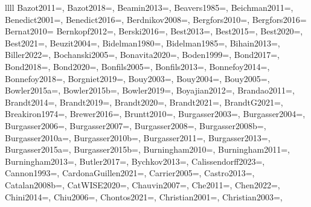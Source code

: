 \documentclass[twocolumn,tighten,twocolappendix]{aastex631}
\begin{document}
\begin{deluxetable*}{llll}
{Bazot2011=\cite{bazot2011},
Bazot2018=\cite{bazot2018},
Beamin2013=\cite{beamin2013},
Beavers1985=\cite{beavers1985},
Beichman2011=\cite{beichman2011},
Benedict2001=\cite{benedict2001},
Benedict2016=\cite{benedict2016},
Berdnikov2008=\cite{berdnikov2008},
Bergfors2010=\cite{bergfors2010},
Bergfors2016=\cite{bergfors2016}
Bernat2010=\cite{bernat2010}
Bernkopf2012=\cite{bernkopf2012},
Berski2016=\cite{berski2016},
Best2013=\cite{best2013},
Best2015=\cite{best2015},
Best2020=\cite{best2020},
Best2021=\cite{best2021},
Beuzit2004=\cite{beuzit2004},
Bidelman1980=\cite{bidelman1980},
Bidelman1985=\cite{bidelman1985},
Bihain2013=\cite{bihain2013},
Biller2022=\cite{biller2022},
Bochanski2005=\cite{bochanski2005},
Bonavita2020=\cite{bonavita2020},
Boden1999=\cite{boden1999},
Bond2017=\cite{bond2017},
Bond2018=\cite{bond2018},
Bond2020=\cite{bond2020},
Bonfils2005=\cite{bonfils2005},
Bonfils2013=\cite{bonfils2013},
Bonnefoy2014=\cite{bonnefoy2014},
Bonnefoy2018=\cite{bonnefoy2018},
Borgniet2019=\cite{borgniet2019},
Bouy2003=\cite{bouy2003},
Bouy2004=\cite{bouy2004},
Bouy2005=\cite{bouy2005},
Bowler2015a=\cite{bowler2015a},
Bowler2015b=\cite{bowler2015b},
Bowler2019=\cite{bowler2019},
Boyajian2012=\cite{boyajian2012},
Brandao2011=\cite{brandao2011},
Brandt2014=\cite{brandt2014},
Brandt2019=\cite{brandt2019},
Brandt2020=\cite{brandt2020},
Brandt2021=\cite{brandt2021},
BrandtG2021=\cite{brandtg2021},
Breakiron1974=\cite{breakiron1974},
Brewer2016=\cite{brewer2016},
Bruntt2010=\cite{bruntt2010},
Burgasser2003=\cite{burgasser2003},
Burgasser2004=\cite{burgasser2004},
Burgasser2006=\cite{burgasser2006},
Burgasser2007=\cite{burgasser2007},
Burgasser2008=\cite{burgasser2008},
Burgasser2008b=\cite{burgasser2008b},
Burgasser2010a=\cite{burgasser2010a},
Burgasser2010b=\cite{burgasser2010b},
Burgasser2011=\cite{burgasser2011},
Burgasser2013=\cite{burgasser2013},
Burgasser2015a=\cite{burgasser2015a},
Burgasser2015b=\cite{burgasser2015b},
Burningham2010=\cite{burningham2010},
Burningham2011=\cite{burningham2011},
Burningham2013=\cite{burningham2013},
Butler2017=\cite{butler2017},
Bychkov2013=\cite{bychkov2013},
Calissendorff2023=\cite{calissendorff2023},
Cannon1993=\cite{henrydraperextension},
CardonaGuillen2021=\cite{cardonaguillen2021},
Carrier2005=\cite{carrier2005},
Castro2013=\cite{castro2013},
Catalan2008b=\cite{catalan2008b},
CatWISE2020=\cite{marocco2021},
Chauvin2007=\cite{chauvin2007},
Che2011=\cite{che2011},
Chen2022=\cite{chen2022},
Chini2014=\cite{chini2014},
Chiu2006=\cite{chiu2006},
Chontos2021=\cite{chontos2021},
Christian2001=\cite{christian2001},
Christian2003=\cite{christian2003},
}
\end{deluxetable*}
\end{document}
